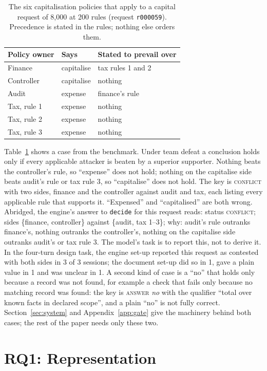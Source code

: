 \documentclass[11pt]{article}
\newcommand{\st}[1]{\textsc{#1}}
\begin{document}
\begin{table}[t]
\centering\small
\caption{The six capitalisation policies that apply to a capital request of 8,000 at 200 rules (request
\texttt{r000059}). Precedence is stated in the rules; nothing else orders them.}
\label{tab:example}
\begin{tabular}{lll}
\toprule
Policy owner & Says & Stated to prevail over\\
\midrule
Finance & capitalise & tax rules 1 and 2\\
Controller & capitalise & nothing\\
Audit & expense & finance's rule\\
Tax, rule 1 & expense & nothing\\
Tax, rule 2 & expense & nothing\\
Tax, rule 3 & expense & nothing\\
\bottomrule
\end{tabular}
\end{table}

Table~\ref{tab:example} shows a case from the benchmark. Under team defeat a conclusion holds only if every
applicable attacker is beaten by a superior supporter. Nothing beats the controller's rule, so ``expense'' does not
hold; nothing on the capitalise side beats audit's rule or tax rule 3, so ``capitalise'' does not hold. The key is
\st{conflict} with two sides, finance and the controller against audit and tax, each listing every applicable rule
that supports it. ``Expensed'' and ``capitalised'' are both wrong. Abridged, the engine's answer to \texttt{decide} for this request reads: status \st{conflict}; sides \{finance, controller\} against \{audit, tax 1--3\}; why: audit's rule outranks finance's, nothing outranks the controller's, nothing on the capitalise side outranks audit's or tax rule 3. The model's task is to report this, not to derive it. In the four-turn design task, the engine set-up
reported this request as contested with both sides in 3 of 3 sessions; the document set-up did so in 1, gave a plain
value in 1 and was unclear in 1. A second kind of case is a ``no'' that holds only because a record was not found,
for example a check that fails only because no matching record was found: the key is \st{answer} \emph{no} with the qualifier ``total over known facts in declared scope'', and a plain ``no'' is not fully correct. Section~\ref{sec:system} and Appendix~\ref{app:gate} give the machinery behind both cases; the rest of the paper needs only these two.

\section{RQ1: Representation}
\label{sec:rq1}
\end{document}
